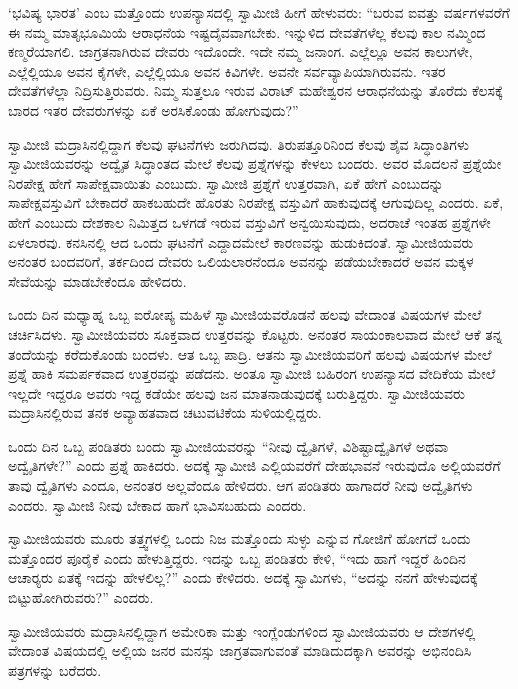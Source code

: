  ‘ಭವಿಷ್ಯ ಭಾರತ’ ಎಂಬ ಮತ್ತೊಂದು ಉಪನ್ಯಾಸದಲ್ಲಿ ಸ್ವಾಮೀಜಿ ಹೀಗೆ ಹೇಳುವರು: “ಬರುವ ಐವತ್ತು ವರ್ಷಗಳವರೆಗೆ ಈ ನಮ್ಮ ಮಾತೃಭೂಮಿಯೆ ಆರಾಧನೆಯ ಇಷ್ಟದೈವವಾಗಬೇಕು. ಇನ್ನುಳಿದ ದೇವತೆಗಳೆಲ್ಲ ಕೆಲವು ಕಾಲ ನಮ್ಮಿಂದ ಕಣ್ಮರೆಯಾಗಲಿ. ಜಾಗ್ರತನಾಗಿರುವ ದೇವರು ಇದೊಂದೇ. ಇದೇ ನಮ್ಮ ಜನಾಂಗ. ಎಲ್ಲೆಲ್ಲೂ ಅವನ ಕಾಲುಗಳೇ, ಎಲ್ಲೆಲ್ಲಿಯೂ ಅವನ ಕೈಗಳೇ, ಎಲ್ಲೆಲ್ಲಿಯೂ ಅವನ ಕಿವಿಗಳೇ. ಅವನೇ ಸರ್ವವ್ಯಾಪಿಯಾಗಿರುವನು. ಇತರ ದೇವತೆಗಳೆಲ್ಲಾ ನಿದ್ರಿಸುತ್ತಿರುವರು. ನಿಮ್ಮ ಸುತ್ತಲೂ ಇರುವ ವಿರಾಟ್ ಮಹೇಶ್ವರನ ಆರಾಧನೆಯನ್ನು ತೊರೆದು ಕೆಲಸಕ್ಕೆ ಬಾರದ ಇತರ ದೇವರುಗಳನ್ನು ಏಕೆ ಅರಸಿಕೊಂಡು ಹೋಗುವುದು?” 

 ಸ್ವಾಮೀಜಿ ಮದ್ರಾಸಿನಲ್ಲಿದ್ದಾಗ ಕೆಲವು ಘಟನೆಗಳು ಜರುಗಿದವು. ತಿರುಪತ್ತೂರಿನಿಂದ ಕೆಲವು ಶೈವ ಸಿದ್ಧಾಂತಿಗಳು ಸ್ವಾಮೀಜಿಯವರನ್ನು ಅದ್ವೈತ ಸಿದ್ಧಾಂತದ ಮೇಲೆ ಕೆಲವು ಪ್ರಶ್ನೆಗಳನ್ನು ಕೇಳಲು ಬಂದರು. ಅವರ ಮೊದಲನೆ ಪ್ರಶ್ನೆಯೇ ನಿರಪೇಕ್ಷ ಹೇಗೆ ಸಾಪೇಕ್ಷವಾಯಿತು ಎಂಬುದು. ಸ್ವಾಮೀಜಿ ಪ್ರಶ್ನೆಗೆ ಉತ್ತರವಾಗಿ, ಏಕೆ ಹೇಗೆ ಎಂಬುದನ್ನು ಸಾಪೇಕ್ಷವಸ್ತುವಿಗೆ ಬೇಕಾದರೆ ಹಾಕಬಹುದೇ ಹೊರತು ನಿರಪೇಕ್ಷ ವಸ್ತುವಿಗೆ ಹಾಕುವುದಕ್ಕೆ ಆಗುವುದಿಲ್ಲ ಎಂದರು. ಏಕೆ, ಹೇಗೆ ಎಂಬುದು ದೇಶಕಾಲ ನಿಮಿತ್ತದ ಒಳಗಡೆ ಇರುವ ವಸ್ತುವಿಗೆ ಅನ್ವಯಿಸುವುದು, ಅದರಾಚೆ ಇಂತಹ ಪ್ರಶ್ನೆಗಳೇ ಏಳಲಾರವು. ಕನಸಿನಲ್ಲಿ ಆದ ಒಂದು ಘಟನೆಗೆ ಎದ್ದಾದಮೇಲೆ ಕಾರಣವನ್ನು ಹುಡುಕಿದಂತೆ. ಸ್ವಾಮೀಜಿಯವರು ಅನಂತರ ಬಂದವರಿಗೆ, ತರ್ಕದಿಂದ ದೇವರು ಒಲಿಯಲಾರನೆಂದೂ ಅವನನ್ನು ಪಡೆಯಬೇಕಾದರೆ ಅವನ ಮಕ್ಕಳ ಸೇವೆಯನ್ನು ಮಾಡಬೇಕೆಂದೂ ಹೇಳಿದರು. 

 ಒಂದು ದಿನ ಮಧ್ಯಾಹ್ನ ಒಬ್ಬ ಐರೋಪ್ಯ ಮಹಿಳೆ ಸ್ವಾಮೀಜಿಯವರೊಡನೆ ಹಲವು ವೇದಾಂತ ವಿಷಯಗಳ ಮೇಲೆ ಚರ್ಚಿಸಿದಳು. ಸ್ವಾಮೀಜಿಯವರು ಸೂಕ್ತವಾದ ಉತ್ತರವನ್ನು ಕೊಟ್ಟರು. ಅನಂತರ ಸಾಯಂಕಾಲವಾದ ಮೇಲೆ ಆಕೆ ತನ್ನ ತಂದೆಯನ್ನು ಕರೆದುಕೊಂಡು ಬಂದಳು. ಆತ ಒಬ್ಬ ಪಾದ್ರಿ. ಆತನು ಸ್ವಾಮೀಜಿಯವರಿಗೆ ಹಲವು ವಿಷಯಗಳ ಮೇಲೆ ಪ್ರಶ್ನೆ ಹಾಕಿ ಸಮರ್ಪಕವಾದ ಉತ್ತರವನ್ನು ಪಡೆದನು. ಅಂತೂ ಸ್ವಾಮೀಜಿ ಬಹಿರಂಗ ಉಪನ್ಯಾಸದ ವೇದಿಕೆಯ ಮೇಲೆ ಇಲ್ಲದೇ ಇದ್ದರೂ ಅವರು ಇದ್ದ ಕಡೆಯೇ ಹಲವು ಜನ ಮಾತನಾಡುವುದಕ್ಕೆ ಬರುತ್ತಿದ್ದರು. ಸ್ವಾಮೀಜಿಯವರು ಮದ್ರಾಸಿನಲ್ಲಿರುವ ತನಕ ಅವ್ಯಾಹತವಾದ ಚಟುವಟಿಕೆಯ ಸುಳಿಯಲ್ಲಿದ್ದರು. 

 ಒಂದು ದಿನ ಒಬ್ಬ ಪಂಡಿತರು ಬಂದು ಸ್ವಾಮೀಜಿಯವರನ್ನು “ನೀವು ದ್ವೈತಿಗಳೆ, ವಿಶಿಷ್ಟಾದ್ವೈತಿಗಳೆ ಅಥವಾ ಅದ್ವೈತಿಗಳೇ?” ಎಂದು ಪ್ರಶ್ನೆ ಹಾಕಿದರು. ಅದಕ್ಕೆ ಸ್ವಾಮೀಜಿ ಎಲ್ಲಿಯವರೆಗೆ ದೇಹಭಾವನೆ ಇರುವುದೊ ಅಲ್ಲಿಯವರೆಗೆ ತಾವು ದ್ವೈತಿಗಳು ಎಂದೂ, ಅನಂತರ ಅಲ್ಲವೆಂದೂ ಹೇಳಿದರು. ಆಗ ಪಂಡಿತರು ಹಾಗಾದರೆ ನೀವು ಅದ್ವೈತಿಗಳು ಎಂದರು. ಸ್ವಾಮೀಜಿ ನೀವು ಬೇಕಾದ ಹಾಗೆ ಭಾವಿಸಬಹುದು ಎಂದರು. 

 ಸ್ವಾಮೀಜಿಯವರು ಮೂರು ತತ್ತ್ವಗಳಲ್ಲಿ ಒಂದು ನಿಜ ಮತ್ತೊಂದು ಸುಳ್ಳು ಎನ್ನುವ ಗೋಜಿಗೆ ಹೋಗದೆ ಒಂದು ಮತ್ತೊಂದರ ಪೂರೈಕೆ ಎಂದು ಹೇಳುತ್ತಿದ್ದರು. ಇದನ್ನು ಒಬ್ಬ ಪಂಡಿತರು ಕೇಳಿ, “ಇದು ಹಾಗೆ ಇದ್ದರೆ ಹಿಂದಿನ ಆಚಾರ‍್ಯರು ಏತಕ್ಕೆ ಇದನ್ನು ಹೇಳಲಿಲ್ಲ?” ಎಂದು ಕೇಳಿದರು. ಅದಕ್ಕೆ ಸ್ವಾಮಿಗಳು, “ಅದನ್ನು ನನಗೆ ಹೇಳುವುದಕ್ಕೆ ಬಿಟ್ಟುಹೋಗಿರುವರು?” ಎಂದರು. 

 ಸ್ವಾಮೀಜಿಯವರು ಮದ್ರಾಸಿನಲ್ಲಿದ್ದಾಗ ಅಮೇರಿಕಾ ಮತ್ತು ಇಂಗ್ಲೆಂಡುಗಳಿಂದ ಸ್ವಾಮೀಜಿಯವರು ಆ ದೇಶಗಳಲ್ಲಿ ವೇದಾಂತ ವಿಷಯದಲ್ಲಿ ಅಲ್ಲಿಯ ಜನರ ಮನಸ್ಸು ಜಾಗ್ರತವಾಗುವಂತೆ ಮಾಡಿದುದಕ್ಕಾಗಿ ಅವರನ್ನು ಅಭಿನಂದಿಸಿ ಪತ್ರಗಳನ್ನು ಬರೆದರು. 

